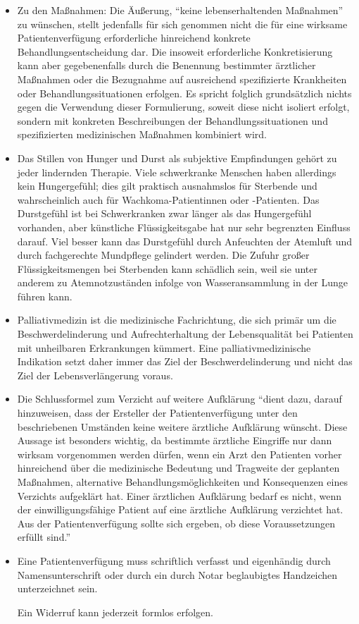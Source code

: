 \documentclass[pdftex,12pt,a4paper]{article}
\begin{document}
\begin{itemize}
\item Zu den Maßnahmen: Die Äußerung, \enquote{keine lebenserhaltenden Maßnahmen} zu wünschen, stellt jedenfalls für sich genommen nicht die für
eine wirksame Patientenverfügung erforderliche hinreichend konkrete Behandlungsentscheidung dar. Die insoweit
erforderliche Konkretisierung kann aber gegebenenfalls durch die Benennung bestimmter ärztlicher Maßnahmen oder die
Bezugnahme auf ausreichend spezifizierte Krankheiten oder Behandlungssituationen erfolgen. Es spricht folglich
grundsätzlich nichts gegen die Verwendung dieser Formulierung, soweit diese nicht isoliert erfolgt, sondern mit konkreten
Beschreibungen der Behandlungssituationen und spezifizierten medizinischen Maßnahmen kombiniert wird. 

\item Das Stillen von Hunger und Durst als subjektive Empfindungen gehört zu jeder lindernden Therapie. Viele
schwerkranke Menschen haben allerdings kein Hungergefühl; dies gilt praktisch ausnahmslos für Sterbende und
wahrscheinlich auch für Wachkoma-Patientinnen oder -Patienten. Das Durstgefühl ist bei Schwerkranken zwar länger als
das Hungergefühl vorhanden, aber künstliche Flüssigkeitsgabe hat nur sehr begrenzten Einfluss darauf. Viel besser kann
das Durstgefühl durch Anfeuchten der Atemluft und durch fachgerechte Mundpflege gelindert werden. Die Zufuhr großer
Flüssigkeitsmengen bei Sterbenden kann schädlich sein, weil sie unter anderem  zu Atemnotzuständen infolge von
Wasseransammlung in der Lunge führen kann.

\item Palliativmedizin ist die medizinische Fachrichtung, die sich primär um die Beschwerdelinderung und Aufrechterhaltung der Lebensqualität bei Patienten mit unheilbaren Erkrankungen kümmert. Eine palliativmedizinische Indikation setzt daher immer das Ziel der Beschwerdelinderung und nicht das Ziel der Lebensverlängerung voraus.

\item Die Schlussformel zum Verzicht auf weitere Aufklärung \enquote{dient dazu, darauf hinzuweisen, dass der Ersteller der Patientenverfügung unter den beschriebenen Umständen keine weitere ärztliche Aufklärung wünscht. Diese Aussage ist besonders wichtig, da bestimmte ärztliche Eingriffe nur dann wirksam vorgenommen werden dürfen, wenn ein Arzt den Patienten vorher hinreichend über die medizinische Bedeutung und Tragweite der geplanten Maßnahmen, alternative Behandlungsmöglichkeiten und Konsequenzen eines Verzichts aufgeklärt hat. Einer ärztlichen Aufklärung bedarf es nicht, wenn der einwilligungsfähige Patient auf eine ärztliche Aufklärung verzichtet hat. Aus der Patientenverfügung sollte sich ergeben, ob diese Voraussetzungen erfüllt sind.}

\item Eine Patientenverfügung muss schriftlich verfasst  
und eigenhändig durch Namensunterschrift oder durch ein durch Notar beglaubigtes Handzeichen unterzeichnet sein. 

Ein Widerruf kann jederzeit formlos erfolgen.


\end{itemize}

 
\end{document}
